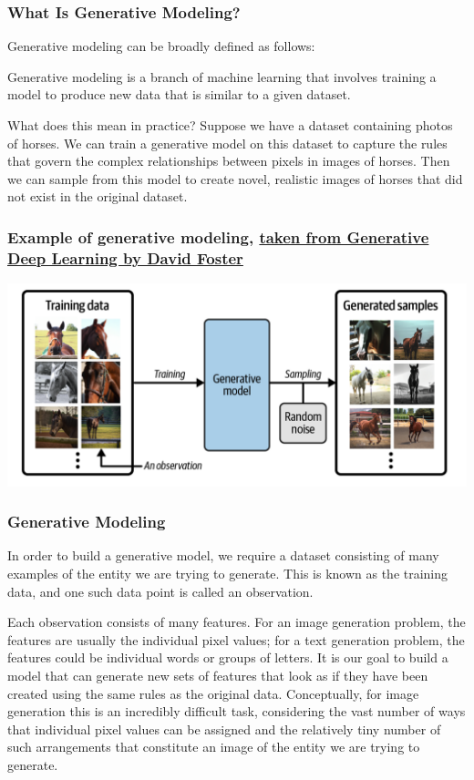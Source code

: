 \documentclass{beamer}
\begin{document}
\begin{frame}
\frametitle{What Is Generative Modeling?}

Generative modeling can be broadly defined as follows:

Generative modeling is a branch of machine learning that involves
training a model to produce new data that is similar to a given
dataset.

What does this mean in practice? Suppose we have a dataset containing
photos of horses. We can train a generative model on this dataset to
capture the rules that govern the complex relationships between pixels
in images of horses. Then we can sample from this model to create
novel, realistic images of horses that did not exist in the original
dataset.
\end{frame}

\begin{frame}
\frametitle{Example of generative modeling, \href{{https://www.oreilly.com/library/view/generative-deep-learning/9781098134174/ch01.html}}{taken from Generative Deep Learning by David Foster}}

\vspace{6mm}

\centerline{\includegraphics[width=1.0\linewidth]{figures/generativelearning.png}}

\vspace{6mm}
\end{frame}

\begin{frame}
\frametitle{Generative Modeling}

In order to build a generative model, we require a dataset consisting
of many examples of the entity we are trying to generate. This is
known as the training data, and one such data point is called an
observation.

Each observation consists of many features. For an image generation
problem, the features are usually the individual pixel values; for a
text generation problem, the features could be individual words or
groups of letters. It is our goal to build a model that can generate
new sets of features that look as if they have been created using the
same rules as the original data. Conceptually, for image generation
this is an incredibly difficult task, considering the vast number of
ways that individual pixel values can be assigned and the relatively
tiny number of such arrangements that constitute an image of the
entity we are trying to generate.
\end{frame}
\end{document}
